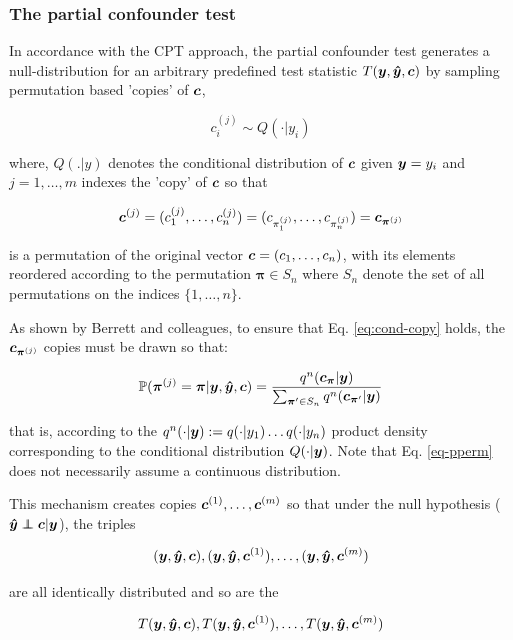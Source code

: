 \documentclass{article}
\begin{document}
\subsubsection*{The partial confounder test}
\label{sec:methods-pct}

In accordance with the CPT approach, the partial confounder test generates a null-distribution for an arbitrary predefined test statistic $T(\boldsymbol{y},\boldsymbol{\hat{y}},\boldsymbol{c})$ by sampling permutation based 'copies' of $\boldsymbol{c}$,

\begin{equation}
    c_i^{(j)} \sim Q(\cdot|y_i)
     \label{eq:cond-copy}
\end{equation}

where, $Q(.|y)$ denotes the conditional distribution of $\boldsymbol{c}$ given $\boldsymbol{y}=y_i$ and $j=1,\dots, m$ indexes the 'copy' of $\boldsymbol{c}$ so that

$$ \boldsymbol{c}^{(j)} = (c_1^{(j)}, \dots, c_n^{(j)}) = (c_{\pi_1^{(j)}}, \dots, c_{\pi_n^{(j)}}) =  \boldsymbol{c}_{\boldsymbol{\pi}^{(j)}} $$

is a permutation of the original vector $\boldsymbol{c} = (c_1, \dots, c_n)$, with its elements reordered according to the permutation $ \boldsymbol{\pi} \in S_n$ where $S_n$ denote the set of all permutations on the indices $\{1,\dots,n\}$.

As shown by Berrett and colleagues\cite{berrett2020conditional}, to ensure that Eq. \ref{eq:cond-copy} holds, the $\boldsymbol{c}_{\boldsymbol{\pi}^{(j)}}$ copies must be drawn so that:

\begin{equation}
    \label{eq-pperm}
    \mathbb{P}(\boldsymbol{ \pi }^{(j)} = \boldsymbol{ \pi } | \boldsymbol{y},\boldsymbol{\hat{y}},\boldsymbol{c}) = \frac{q^n(\boldsymbol{c}_{\boldsymbol{ \pi }} | \boldsymbol{y})}{\sum_{\boldsymbol{ \pi } ' \in S_n} q^n(\boldsymbol{c}_{\boldsymbol{ \pi } ' } | \boldsymbol{y})}
\end{equation}


that is, according to the $q^n(\cdot|\boldsymbol{y}) := q(\cdot | y_1) \dots q(\cdot|y_n)$ product density corresponding to the conditional distribution $Q(\cdot|\boldsymbol{y})$. Note that Eq. \ref{eq-pperm} does not necessarily assume a continuous distribution.

This mechanism creates copies $\boldsymbol{c}^{(1)}, \dots ,\boldsymbol{c}^{(m)}$ so that under the null hypothesis ($\yhat \independent \c | \y$), the triples 

$$(\boldsymbol{y},\boldsymbol{\hat{y}},\boldsymbol{c}), (\boldsymbol{y}, \boldsymbol{\hat{y}}, \boldsymbol{c}^{(1)}),\dots, (\boldsymbol{y}, \boldsymbol{\hat{y}}, \boldsymbol{c}^{(m)})$$

are all identically distributed and so are the 

$$T(\boldsymbol{y},\boldsymbol{\hat{y}},\boldsymbol{c}), T(\boldsymbol{y}, \boldsymbol{\hat{y}}, \boldsymbol{c}^{(1)}),\dots,T(\boldsymbol{y}, \boldsymbol{\hat{y}}, \boldsymbol{c}^{(m)})$$
\end{document}
